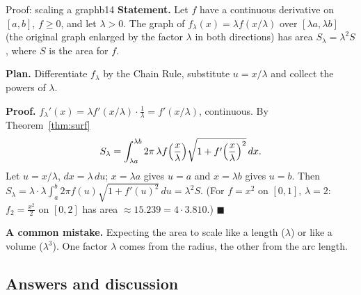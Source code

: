 \documentclass[11pt]{article}
\begin{document}
\begin{exmp}{Proof: scaling a graph}{b14}
\textbf{Statement.} Let $f$ have a continuous derivative on $[a,b]$, $f\ge0$, and let $\lambda>0$. The graph of $f_\lambda(x)=\lambda f(x/\lambda)$ over $[\lambda a,\lambda b]$ (the original graph enlarged by the factor $\lambda$ in both directions) has area $S_\lambda=\lambda^2S$, where $S$ is the area for $f$.

\textbf{Plan.} Differentiate $f_\lambda$ by the Chain Rule, substitute $u=x/\lambda$ and collect the powers of $\lambda$.

\textbf{Proof.} $f_\lambda'(x)=\lambda f'(x/\lambda)\cdot\frac1\lambda=f'(x/\lambda)$, continuous. By Theorem~\ref{thm:surf}
\[
S_\lambda=\int_{\lambda a}^{\lambda b}2\pi\,\lambda f\Bigl(\frac x\lambda\Bigr)\sqrt{1+f'\Bigl(\frac x\lambda\Bigr)^2}\,dx .
\]
Let $u=x/\lambda$, $dx=\lambda\,du$; $x=\lambda a$ gives $u=a$ and $x=\lambda b$ gives $u=b$. Then $S_\lambda=\lambda\cdot\lambda\int_a^b2\pi f(u)\sqrt{1+f'(u)^2}\,du=\lambda^2S$. (For $f=x^2$ on $[0,1]$, $\lambda=2$: $f_2=\frac{x^2}2$ on $[0,2]$ has area $\approx15.239=4\cdot3.810$.) $\blacksquare$

\textbf{A common mistake.} Expecting the area to scale like a length ($\lambda$) or like a volume ($\lambda^3$). One factor $\lambda$ comes from the radius, the other from the arc length.
\end{exmp}

\subsection*{Answers and discussion}
\end{document}
